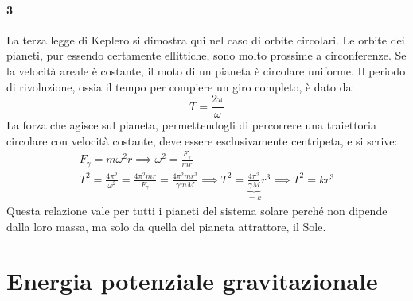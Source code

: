 \documentclass[10pt,a4paper]{book}
\begin{document}
\paragraph{3} La terza legge di Keplero si dimostra qui nel caso di orbite circolari. Le orbite dei pianeti, pur essendo certamente ellittiche, sono molto prossime a circonferenze. Se la velocità areale è costante, il moto di un pianeta è circolare uniforme. Il periodo di rivoluzione, ossia il tempo per compiere un giro completo, è dato da:
\[
	T=\frac{2\pi}{\omega}
\]
La forza che agisce sul pianeta, permettendogli di percorrere una traiettoria circolare con velocità costante, deve essere esclusivamente centripeta, e si scrive:
\begin{gather*}
	F_\gamma=m\omega^2r \implies \omega^2=\frac{F_\gamma}{mr} \\
	T^2=\frac{4\pi^2}{\omega^2}=\frac{4\pi^2mr}{F_\gamma}=\frac{4\pi^2mr^3}{\gamma mM} \implies T^2=\underbrace{\frac{4\pi^2}{\gamma M}}_{=k} r^3 \implies T^2=kr^3
\end{gather*}
Questa relazione vale per tutti i pianeti del sistema solare perché non dipende dalla loro massa, ma solo da quella del pianeta attrattore, il Sole.







































\section{Energia potenziale gravitazionale}
\end{document}
